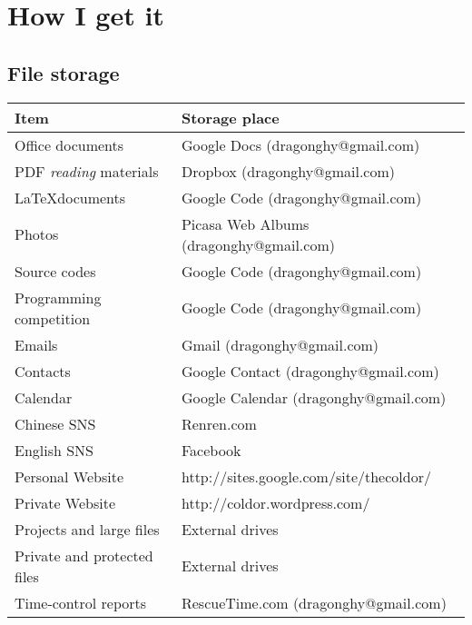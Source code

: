 \section{How I get it}

\subsection{File storage}

\begin{tabular}{|l|l|}
  \hline
  Item & Storage place \\
  \hline
  Office documents & Google Docs (dragonghy@gmail.com) \\
  PDF \emph{reading} materials & Dropbox (dragonghy@gmail.com) \\
  \LaTeX documents & Google Code (dragonghy@gmail.com) \\
  Photos & Picasa Web Albums (dragonghy@gmail.com) \\ 
  Source codes & Google Code (dragonghy@gmail.com) \\
  Programming competition & Google Code (dragonghy@gmail.com) \\
  Emails & Gmail (dragonghy@gmail.com) \\ 
  Contacts & Google Contact (dragonghy@gmail.com) \\ 
  Calendar & Google Calendar (dragonghy@gmail.com) \\ 
  Chinese SNS & Renren.com \\
  English SNS & Facebook \\
  Personal Website & http://sites.google.com/site/thecoldor/ \\
  Private Website & http://coldor.wordpress.com/ \\ 
  Projects and large files & External drives \\
  Private and protected files & External drives \\
  Time-control reports & RescueTime.com (dragonghy@gmail.com) \\
  \hline
\end{tabular}
